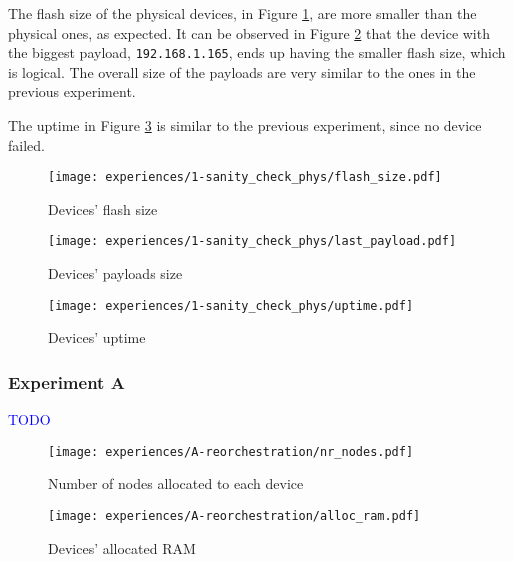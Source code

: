 The flash size  of the physical devices, in Figure \ref{fig:sanity_check_phys_flash_size}, are more smaller than the physical ones, as expected. It can be observed in Figure \ref{fig:sanity_check_phys_last_payload} that the device with the biggest payload, \texttt{192.168.1.165}, ends up having the smaller flash size, which is logical. The overall size of the payloads are very similar to the ones in the previous experiment. 

The uptime in Figure \ref{fig:sanity_check_phys_uptime} is similar to the previous experiment, since no device failed.

\begin{figure}[H]
\centering
\texttt{[image: experiences/1-sanity\_check\_phys/flash\_size.pdf]}
\caption[Devices' flash size]{Devices' flash size}\label{fig:sanity_check_phys_flash_size}
\end{figure}

\begin{figure}[h]
\centering
\texttt{[image: experiences/1-sanity\_check\_phys/last\_payload.pdf]}
\caption[Devices' payloads size]{Devices' payloads size}\label{fig:sanity_check_phys_last_payload}
\end{figure}

\begin{figure}[H]
\centering
\texttt{[image: experiences/1-sanity\_check\_phys/uptime.pdf]}
\caption[Devices' uptime]{Devices' uptime}\label{fig:sanity_check_phys_uptime}
\end{figure}


\subsubsection{Experiment A}

\textcolor{blue}{TODO}

\begin{figure}[h]
\centering
\texttt{[image: experiences/A-reorchestration/nr\_nodes.pdf]}
\caption[Number of nodes allocated to each device]{Number of nodes allocated to each device}\label{fig:reorchestration_nr_nodes}
\end{figure}
    
\begin{figure}[h]
\centering
\texttt{[image: experiences/A-reorchestration/alloc\_ram.pdf]}
\caption[Devices' allocated RAM]{Devices' allocated RAM}\label{fig:reorchestration_alloc_ram}
\end{figure}

